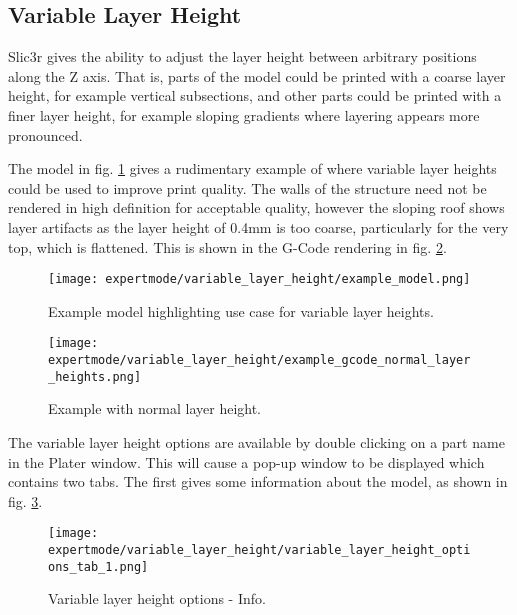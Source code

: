 
\subsection{Variable Layer Height} %
\label{sec:variable_layer_height}

Slic3r gives the ability to adjust the layer height between arbitrary positions along the Z axis.  That is, parts of the model could be printed with a coarse layer height, for example vertical subsections, and other parts could be printed with a finer layer height, for example sloping gradients where layering appears more pronounced.

The model in fig. \ref{fig:example_model} gives a rudimentary example of where variable layer heights could be used to improve print quality.  The walls of the structure need not be rendered in high definition for acceptable quality, however the sloping roof shows layer artifacts as the layer height of 0.4mm is too coarse, particularly for the very top, which is flattened.  This is shown in the G-Code rendering in fig. \ref{fig:example_gcode_normal_layer_heights}.


\begin{figure}[H]
\centering
\texttt{[image: expertmode/variable\_layer\_height/example\_model.png]}
\caption{Example model highlighting use case for variable layer heights.}
\label{fig:example_model}
\end{figure}

\begin{figure}[H]
\centering
\texttt{[image: expertmode/variable\_layer\_height/example\_gcode\_normal\_layer\_heights.png]}
\caption{Example with normal layer height.}
\label{fig:example_gcode_normal_layer_heights}
\end{figure}

The variable layer height options are available by double clicking on a part name in the Plater window.  This will cause a pop-up window to be displayed which contains two tabs. The first gives some information about the model, as shown in fig. \ref{fig:variable_layer_height_options_tab_1}.

\begin{figure}[H]
\centering
\texttt{[image: expertmode/variable\_layer\_height/variable\_layer\_height\_options\_tab\_1.png]}
\caption{Variable layer height options - Info.}
\label{fig:variable_layer_height_options_tab_1}
\end{figure}

